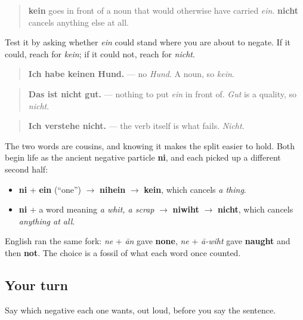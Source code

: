 \begin{grammarlens}[title={Grammar Lens: one cancels a noun, one cancels the rest}]
\begin{quote}
\textbf{kein} goes in front of a noun that would otherwise have carried \emph{ein}. \textbf{nicht} cancels anything else at all.
\end{quote}

Test it by asking whether \emph{ein} could stand where you are about to negate. If it could, reach for \emph{kein}; if it could not, reach for \emph{nicht}.

\begin{quote}
\textbf{Ich habe keinen Hund.} — no \emph{Hund}. A noun, so \emph{kein}.
\end{quote}

\begin{quote}
\textbf{Das ist nicht gut.} — nothing to put \emph{ein} in front of. \emph{Gut} is a quality, so \emph{nicht}.
\end{quote}

\begin{quote}
\textbf{Ich verstehe nicht.} — the verb itself is what fails. \emph{Nicht}.
\end{quote}
\end{grammarlens}

\begin{cousinweb}
The two words are cousins, and knowing it makes the split easier to hold. Both begin life as the ancient negative particle \textbf{ni}, and each picked up a different second half:

\begin{itemize}
\raggedright
  \item \textbf{ni} + \textbf{ein} (\textquotedblleft{}one\textquotedblright{}) $\to$ \textbf{nihein} $\to$ \textbf{kein}, which cancels \emph{a thing}.
  \item \textbf{ni} + a word meaning \emph{a whit, a scrap} $\to$ \textbf{niwiht} $\to$ \textbf{nicht}, which cancels \emph{anything at all}.
\end{itemize}

English ran the same fork: \emph{ne} + \emph{ān} gave \textbf{none}, \emph{ne} + \emph{ā-wiht} gave \textbf{naught} and then \textbf{not}. The choice is a fossil of what each word once counted.
\end{cousinweb}

\subsection*{Your turn}
Say which negative each one wants, out loud, before you say the sentence.

